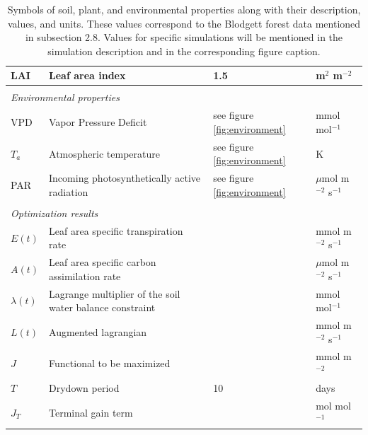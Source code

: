 \documentclass[utf8]{frontiersSCNS} %
\begin{document}
\begin{table}[h]
\begin{tabular}{l l l l}
        LAI & Leaf area index & 1.5 & m$^{2}$ m$^{-2}$\\
        \hline
        \multicolumn{4}{l}{}\\
        \multicolumn{4}{l}{\textit{Environmental properties}}\\
        \hline
        VPD & Vapor Pressure Deficit & see figure \ref{fig:environment} & mmol mol$^{-1}$\\
        $T_a$ & Atmospheric temperature & see figure \ref{fig:environment} & K \\
        PAR & Incoming photosynthetically active radiation & see figure \ref{fig:environment} & $\mu$mol m$^{-2}$ s$^{-1}$ \\
        \hline
        \multicolumn{4}{l}{}\\
        \multicolumn{4}{l}{\textit{Optimization results}}\\
        \hline
        $E(t)$ & Leaf area specific transpiration rate & & mmol m$^{-2}$ s$^{-1}$\\
        $A(t)$ & Leaf area specific carbon assimilation rate & & $\mu$mol m$^{-2}$ s$^{-1}$\\
        $\lambda (t)$ & Lagrange multiplier of the soil water balance constraint & & mmol mol$^{-1}$\\
        $L(t)$ & Augmented lagrangian & & mmol m$^{-2}$ s$^{-1}$\\
        $J$ & Functional to be maximized & & mmol m$^{-2}$\\
        $T$ & Drydown period & 10 & days\\
        $J_T$ & Terminal gain term & & mol mol$^{-1}$\\
    \end{tabular}
    \caption{Symbols of soil, plant, and environmental properties along with their description, values, and units. These values correspond to the Blodgett forest data mentioned in subsection 2.8. Values for specific simulations will be mentioned in the simulation description and in the corresponding figure caption.}
    \label{tab:props}
\end{table}



\end{document}

